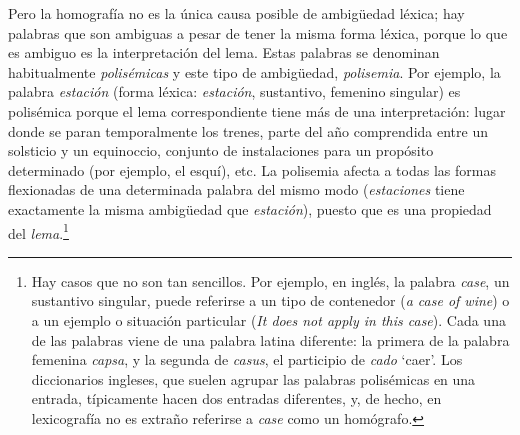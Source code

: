 Pero la homografía no es la única causa posible de ambigüedad léxica; hay palabras que son ambiguas a pesar de tener la misma forma léxica, porque lo que es ambiguo es la interpretación del lema. Estas palabras se denominan habitualmente \emph{polisémicas} y este tipo de ambigüedad, \emph{polisemia}. Por ejemplo, la palabra \emph{estación} (forma léxica: \emph{estación}, sustantivo, femenino singular) es polisémica porque el lema correspondiente tiene más de una interpretación: lugar donde se paran temporalmente los trenes, parte del año comprendida entre un solsticio y un equinoccio, conjunto de instalaciones para un propósito determinado (por ejemplo, el esquí), etc. La polisemia afecta a todas las formas flexionadas de una determinada palabra del mismo modo (\emph{estaciones} tiene exactamente la misma ambigüedad que \emph{estación}), puesto que es una propiedad del \emph{lema}.\footnote{Hay casos que no son tan sencillos. Por ejemplo, en inglés, la palabra \emph{case}, un sustantivo singular, puede referirse a un tipo de contenedor (\emph{a case of wine}) o a un ejemplo o situación particular (\emph{It does not apply in this case}). Cada una de las palabras viene de una palabra latina diferente: la primera de la palabra femenina \emph{capsa}, y la segunda de \emph{casus}, el participio de \emph{cado} `caer'. Los diccionarios ingleses, que suelen agrupar las palabras polisémicas en una entrada, típicamente hacen dos entradas diferentes, y, de hecho, en lexicografía no es extraño referirse a \emph{case} como un homógrafo.} 

